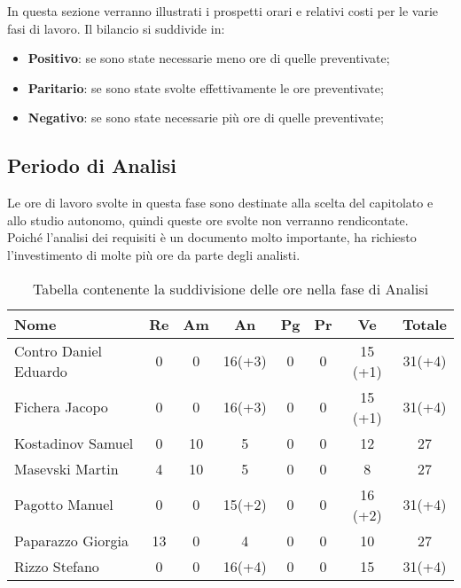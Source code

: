 \documentclass[../piano_di_progetto.tex]{subfiles}
\begin{document}
In questa sezione verranno illustrati i prospetti orari e relativi costi per le varie fasi di lavoro. Il bilancio si suddivide in:
\begin{itemize}
\item \textbf{Positivo}: se sono state necessarie meno ore di quelle preventivate;
\item \textbf{Paritario}: se sono state svolte effettivamente le ore preventivate;
\item \textbf{Negativo}: se sono state necessarie più ore di quelle preventivate;
\end{itemize}

\subsection{ Periodo di Analisi}%
\label{sub:cons_analisi}
Le ore di lavoro svolte in questa fase sono destinate alla scelta del capitolato e allo studio autonomo, quindi queste ore svolte non verranno rendicontate.\\
Poiché l'analisi dei requisiti è un documento molto importante, ha richiesto l'investimento di molte più ore da parte degli analisti.

\begin{table}[!ht]
	\centering
	\begin{tabular}{|l|c|c|c|c|c|c|c|}
	\hline
	\rowcolor{lightgray}
	\textbf{Nome} & \textbf{Re} & \textbf{Am} & \textbf{An} & \textbf{Pg}  & \textbf{Pr}   & \textbf{Ve} & \textbf{Totale}\\
	\hline
	Contro Daniel Eduardo & 0 & 0 & 16(+3) & 0 & 0 & 15 (+1) & 31(+4) \\
	Fichera Jacopo & 0 & 0 & 16(+3) & 0 & 0 & 15 (+1) & 31(+4) \\
	Kostadinov Samuel & 0 & 10 & 5 & 0 & 0 & 12 & 27 \\			
	Masevski Martin & 4 & 10 & 5 & 0 & 0 & 8 & 27 \\
	Pagotto Manuel & 0 & 0 & 15(+2) & 0 & 0 & 16 (+2) & 31(+4) \\			
	Paparazzo Giorgia & 13 & 0 & 4 & 0 & 0 & 10 & 27 \\
	Rizzo Stefano & 0 & 0 & 16(+4) & 0 & 0 & 15 & 31(+4) \\
	\hline
	\end{tabular}
	\caption{Tabella contenente la suddivisione delle ore nella fase di Analisi}
\end{table}
\end{document}
